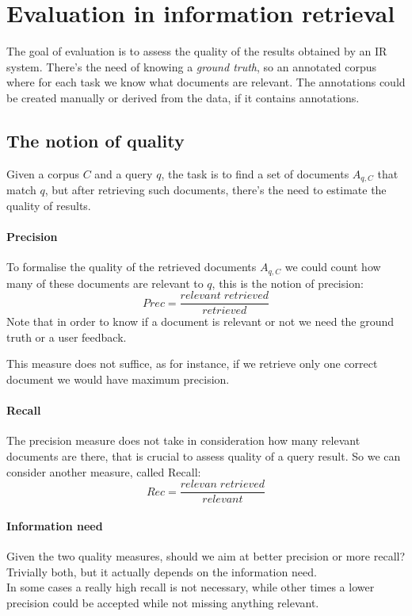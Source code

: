 \section{Evaluation in information retrieval}

The goal of evaluation is to assess the quality of the results 
obtained by an IR system.
There's the need of knowing a \emph{ground truth}, so an annotated corpus 
where for each task we know what documents are relevant. The annotations
could be created manually or derived from the data, if it contains 
annotations.

\subsection{The notion of quality}
Given a corpus $C$ and a query $q$, the task is to find a set of 
documents $A_{q,C}$ that match $q$, but after retrieving such documents, 
there's the need to estimate the quality of results.

\paragraph{Precision}
To formalise the quality of the retrieved documents $A_{q,C}$ we could 
count how many of these documents are relevant to $q$, this 
is the notion of precision:
$$\mathit{Prec} = \frac{\mathit{relevant\;retrieved}}{\mathit{retrieved}}$$
Note that in order to know if a document is relevant or not we need the 
ground truth or a user feedback.

This measure does not suffice, as for instance, if we retrieve 
only one correct document we would have maximum precision.

\paragraph{Recall}
The precision measure does not take in consideration how many relevant 
documents are there, that is crucial to assess quality of a query result.
So we can consider another measure, called Recall:
$$\mathit{Rec} = \frac{\mathit{relevan\;retrieved}}{\mathit{relevant}}$$

\paragraph{Information need}
Given the two quality measures, should we aim at better precision or more 
recall? Trivially both, but it actually depends on the information need.\\
In some cases a really high recall is not necessary, while other times
a lower precision could be accepted while not missing anything relevant.

